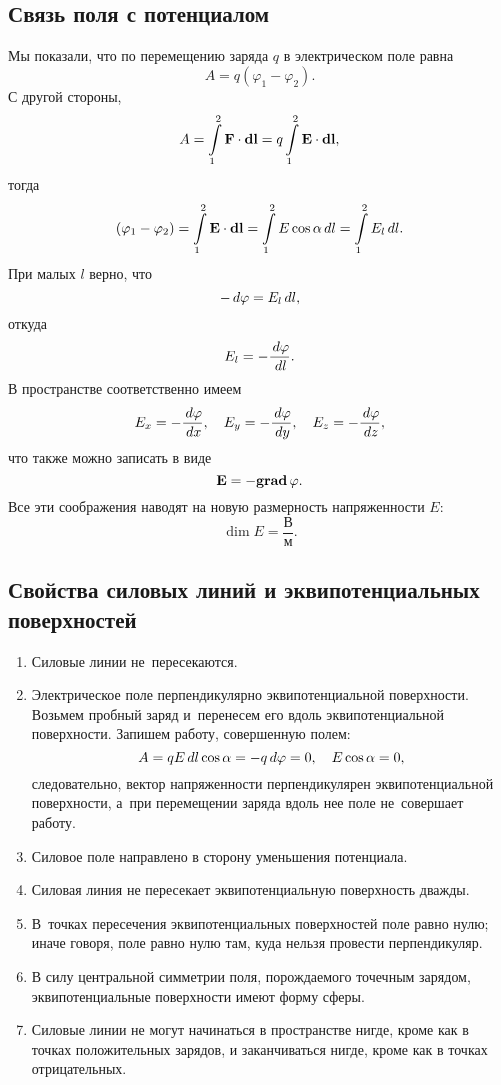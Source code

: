 	\subsection{Связь поля с потенциалом} 	

		Мы показали, что по перемещению заряда $q$ в электрическом поле равна
			$$A=q\left(\varphi_1-\varphi_2\right).$$
		С другой стороны,
			$$A=\int\limits_1^2\text{\textbf{F}}\cdot\textbf{d}\text{\textbf{l}}=q\int\limits_1^2\text{\textbf{E}}\cdot\textbf{d}\text{\textbf{l}},$$
		тогда
			$$\left(\varphi_1-\varphi_2\right)=\int\limits_1^2\text{\textbf{E}}\cdot\textbf{d}\text{\textbf{l}}=\int\limits_1^2 E\cos{\alpha}\,d l=\int\limits_1^2 E_l\,d l.$$
		При малых $l$ верно, что
			$$-\,d \varphi=E_l\,d l,$$
		откуда
		\begin{equation}
			E_l=-\frac{\,d \varphi}{\,d l}.
		\end{equation}
		В пространстве соответственно имеем
			$$E_x=-\frac{\,d \varphi}{\,d x}, \quad E_y=-\frac{\,d \varphi}{\,d y}, \quad E_z=-\frac{\,d \varphi}{\,d z},$$
		что также можно записать в виде
			$$\text{\textbf{E}}=-\textbf{grad}\,\varphi.$$
		Все эти соображения наводят на новую размерность напряженности $E$:
			$$\dim{E}=\frac{\text{В}}{\text{м}}.$$

	\subsection{Свойства силовых линий и эквипотенциальных поверхностей}
		\begin{enumerate}
			\item Силовые линии не~пересекаются.
			\item Электрическое поле перпендикулярно эквипотенциальной поверхности. Возьмем пробный заряд и~перенесем его вдоль эквипотенциальной поверхности. Запишем работу, совершенную полем:
				$$A=qE\,d l\cos{\alpha}=-q\,d \varphi = 0, \quad E\cos{\alpha}=0,$$
				следовательно, вектор напряженности перпендикулярен эквипотенциальной поверхности, а~при перемещении заряда вдоль нее поле не~совершает работу.
			\item Силовое поле направлено в сторону уменьшения потенциала.
			\item Силовая линия не пересекает эквипотенциальную поверхность дважды.
			\item В~точках пересечения эквипотенциальных поверхностей поле равно нулю; иначе говоря, поле равно нулю там, куда нельзя провести перпендикуляр.
			\item В силу центральной симметрии поля, порождаемого точечным зарядом, эквипотенциальные поверхности имеют форму сферы.
			\item Силовые линии не могут начинаться в пространстве нигде, кроме как в точках положительных зарядов, и заканчиваться нигде, кроме как в точках отрицательных.
		\end{enumerate}
